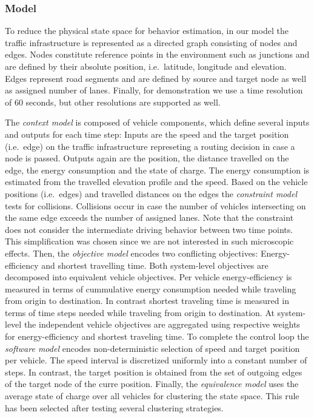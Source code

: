 \documentclass[conference]{../cls/IEEEtran}
\begin{document}
\subsubsection*{Model}

To reduce the physical state space for behavior estimation, in our model the traffic infrastructure is represented as a directed graph consisting of nodes and edges. Nodes constitute reference points in the environment such as junctions and are defined by their absolute position, i.e.\ latitude, longitude and elevation. Edges represent road segments and are defined by source and target node as well as assigned number of lanes. Finally, for demonstration we use a time resolution of 60 seconds, but other resolutions are supported as well.

The \textit{context model} is composed of vehicle components, which define several inputs and outputs for each time step: Inputs are the speed and the target position (i.e.\ edge) on the traffic infrastructure represeting a routing decision in case a node is passed. Outputs again are the position, the distance travelled on the edge, the energy consumption and the state of charge. The energy consumption is estimated from the travelled elevation profile and the speed. Based on the vehicle positions (i.e.\ edges) and travelled distances on the edges the \textit{constraint model} tests for collisions. Collisions occur in case the number of vehicles intersecting on the same edge exceeds the number of assigned lanes. Note that the constraint does not consider the intermediate driving behavior between two time points. This simplification was chosen since we are not interested in such microscopic effects. Then, the \textit{objective model} encodes two conflicting objectives: Energy-efficiency and shortest travelling time. Both system-level objectives are decomposed into equivalent vehicle objectives. Per vehicle energy-efficiency is measured in terms of cummulative energy consumption needed while traveling from origin to destination. In contrast shortest traveling time is measured in terms of time steps needed while traveling from origin to destination. At system-level the independent vehicle objectives are aggregated using respective weights for energy-efficiency and shortest traveling time. To complete the control loop the \textit{software model} encodes non-deterministic selection of speed and target position per vehicle. The speed interval is discretized uniformly into a constant number of steps. In contrast, the target position is obtained from the set of outgoing edges of the target node of the curre position. Finally, the \textit{equivalence model} uses the average state of charge over all vehicles for clustering the state space. This rule has been selected after testing several clustering strategies.
\end{document}

